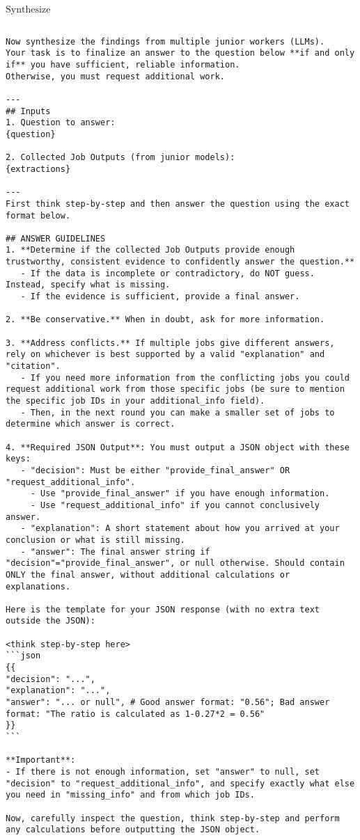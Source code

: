 \textbf{$\mathrm{Synthesize}$}
\begin{tcolorbox}[colback=gray!10,  width=\textwidth]
\begin{lstlisting}[breaklines]

Now synthesize the findings from multiple junior workers (LLMs). 
Your task is to finalize an answer to the question below **if and only if** you have sufficient, reliable information. 
Otherwise, you must request additional work.

---
## Inputs
1. Question to answer:
{question}

2. Collected Job Outputs (from junior models):
{extractions}

---
First think step-by-step and then answer the question using the exact format below.

## ANSWER GUIDELINES
1. **Determine if the collected Job Outputs provide enough trustworthy, consistent evidence to confidently answer the question.** 
   - If the data is incomplete or contradictory, do NOT guess. Instead, specify what is missing.
   - If the evidence is sufficient, provide a final answer.

2. **Be conservative.** When in doubt, ask for more information.

3. **Address conflicts.** If multiple jobs give different answers, rely on whichever is best supported by a valid "explanation" and "citation".
   - If you need more information from the conflicting jobs you could request additional work from those specific jobs (be sure to mention the specific job IDs in your additional_info field).
   - Then, in the next round you can make a smaller set of jobs to determine which answer is correct.

4. **Required JSON Output**: You must output a JSON object with these keys:
   - "decision": Must be either "provide_final_answer" OR "request_additional_info".
     - Use "provide_final_answer" if you have enough information.
     - Use "request_additional_info" if you cannot conclusively answer.
   - "explanation": A short statement about how you arrived at your conclusion or what is still missing.
   - "answer": The final answer string if "decision"="provide_final_answer", or null otherwise. Should contain ONLY the final answer, without additional calculations or explanations.
     
Here is the template for your JSON response (with no extra text outside the JSON):

<think step-by-step here>
```json
{{
"decision": "...",
"explanation": "...",
"answer": "... or null", # Good answer format: "0.56"; Bad answer format: "The ratio is calculated as 1-0.27*2 = 0.56"
}}
```

**Important**:
- If there is not enough information, set "answer" to null, set "decision" to "request_additional_info", and specify exactly what else you need in "missing_info" and from which job IDs.

Now, carefully inspect the question, think step-by-step and perform any calculations before outputting the JSON object.
\end{lstlisting}
\end{tcolorbox}


